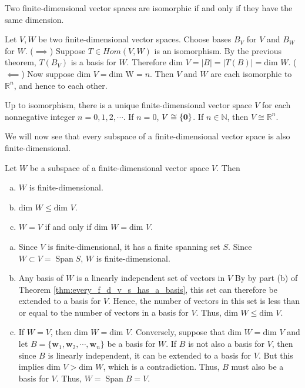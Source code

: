 \documentclass[12pt,letterpaper,reqno]{article}
\numberwithin{equation}{section}
\newcommand{\bw}{\mathbf{w}}
\DeclareMathOperator{\Span}{Span}
\begin{document}
\begin{thm}
	Two finite-dimensional vector spaces are isomorphic if and only if they have the same dimension.
\end{thm}

\begin{pf}
	Let $V, W$ be two finite-dimensional vector spaces. Choose bases $B_V$ for $V$ and $B_W$ for $W$. ($\implies$) Suppose $T \in Hom(V,W)$ is an isomorphism. By the previous theorem, $T(B_V)$ is a basis for $W$. Therefore 
	$\text{dim }V=|B|=|T(B)|=\text{dim }W$. ($\impliedby$) Now suppose $\text{dim }V=\text{dim W}=n$. Then $V$ and $W$ are each isomorphic to $\mathbb{R}^n$, and hence to each other. 
\end{pf}

\begin{cor}
	Up to isomorphism, there is a unique finite-dimensional vector space $V$ for each nonnegative integer $n=0,1,2,\cdots$. If $n=0$, $V \cong \{{\bf 0}\}$. If $n \in \mathbb{N}$, then $V \cong \mathbb{R}^n$.
\end{cor}

We will now see that every subspace of a finite-dimensional vector space is also finite-dimensional.

\begin{thm}\label{thm:sub_fin_is_fin}
	Let $W$ be a subspace of a finite-dimensional vector space $V$. Then
	\begin{enumerate}[(a)]
		\item $W$ is finite-dimensional.
		\item $\text{dim }W \leq \text{dim }V$.
		\item $W=V$ if and only if $\text{dim }W=\text{dim }V$.
	\end{enumerate}
\end{thm}

\begin{pf}
	\begin{enumerate}[(a)]
		\item Since $V$ is finite-dimensional, it has a finite spanning set $S$. Since $W \subset V=\Span S$, $W$ is finite-dimensional.
		\item Any basis of $W$ is a linearly independent set of vectors in $V$ By by part (b) of Theorem \ref{thm:every_f_d_v_s_has_a_basis}, this set can therefore be extended to a basis for $V$. Hence, the number of vectors in this set is less than or equal to the number of vectors in a basis for $V$. Thus, $\text{dim } W \leq \text{dim }V$.
		\item If $W=V$, then $\text{dim }W=\text{dim }V$. Conversely, suppose that $\text{dim } W = \text{dim }V$ and let $B=\{\bw_1,\bw_2,\cdots,\bw_n \}$ be a basis for $W$. If $B$ is not also a basis for $V$, then since $B$ is linearly independent, it can be extended to a basis for $V$. But this implies $\text{dim }V > \text{dim }W$, which is a contradiction. Thus, $B$ must also be a basis for $V$. Thus, $W=\Span B=V$.
	\end{enumerate}
\end{pf}
\end{document}

